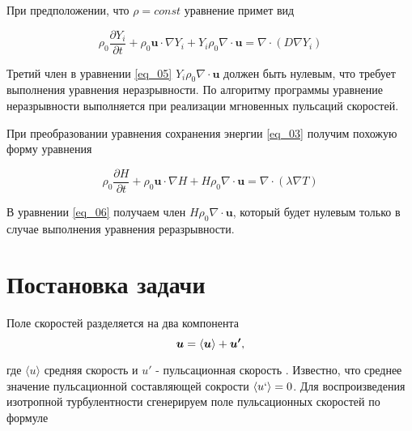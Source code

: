 \documentclass[12pt,a4paper]{article}
\begin{document}
При предположении, что $\rho = const$ уравнение примет вид

\begin{equation}\label{eq_05}
\rho_0 \frac{\partial Y_i}{\partial t} + 
\rho_0 \boldsymbol{u}\cdot \nabla Y_i  + 
Y_i \rho_0 \nabla\cdot \boldsymbol{u} = 
 	\nabla \cdot \left( D \nabla Y_i \right)
\end{equation}


Третий член в уравнении \eqref{eq_05} $Y_i \rho_0 \nabla\cdot  \boldsymbol{u}$ должен быть нулевым, что требует выполнения уравнения неразрывности. По алгоритму программы  уравнение неразрывности выполняется при реализации мгновенных пульсаций скоростей.

При преобразовании уравнения сохранения энергии \eqref{eq_03} получим  похожую форму уравнения

\begin{equation}\label{eq_06}
\rho_0 \frac{\partial H}{\partial t} + 
\rho_0 \boldsymbol{u}\cdot \nabla H  + 
H  \rho_0 \nabla\cdot \boldsymbol{u} = 
\nabla \cdot \left( \lambda \nabla T \right)
\end{equation}

В уравнении \eqref{eq_06} получаем член $H  \rho_0 \nabla\cdot \boldsymbol{u}$, который будет нулевым только в случае выполнения уравнения реразрывности. 

%
%
\section{Постановка задачи}
Поле скоростей разделяется на два компонента
\begin{equation} \label{eq_u_main}
\boldsymbol{u} = \langle \boldsymbol{u} \rangle + \boldsymbol{u'} \\ ,
\end{equation}

где $ \langle u \rangle $ средняя скорость  и $u'$ - пульсационная скорость . Известно, что среднее значение пульсационной составляющей сокрости $\langle u`\rangle = 0 $.
Для воспроизведения изотропной турбулентности сгенерируем поле пульсационных скоростей по формуле
\end{document}
